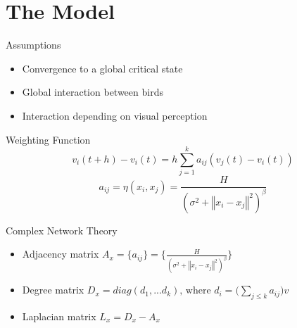 \documentclass{beamer}
\begin{document}
\section{The Model}
\begin{frame}{Assumptions}
\begin{itemize}
  \item Convergence to a global critical state
  \vspace{0.5cm}
  \item Global interaction between birds
  \vspace{0.5cm}
  \item Interaction depending on visual perception
\end{itemize}
\end{frame}
\begin{frame}{Weighting Function}
	\begin{equation}
		v_i(t+h)-v_i(t)=h\sum_{j=1}^k a_{ij}(v_j(t)-v_i(t))\nonumber
	\end{equation}
  \vspace{1cm}
	\begin{equation}
		a_{ij}=\eta(x_i,x_j)=\frac{H}{(\sigma^2+\left\Vert x_i - x_j \right\Vert^2)^{\beta}}\nonumber
	\end{equation}
\end{frame}
\begin{frame}{Complex Network Theory}
	\begin{itemize}
		\item Adjacency matrix $A_x = \lbrace a_{ij}\rbrace=\bigg\lbrace\frac{H}{(\sigma^2+\left\Vert x_i - x_j \right\Vert^2)^{\beta}}\bigg\rbrace\nonumber$
		\vspace{0.5cm}
		\item Degree matrix $D_x = diag(d_1,...d_k) \text{, where } d_i=\bigg(\sum_{j\leq k}a_{ij}\bigg)v$
		\vspace{0.5cm}
		\item Laplacian matrix $L_x = D_x - A_x$
	\end{itemize}
\end{frame}
\end{document}
